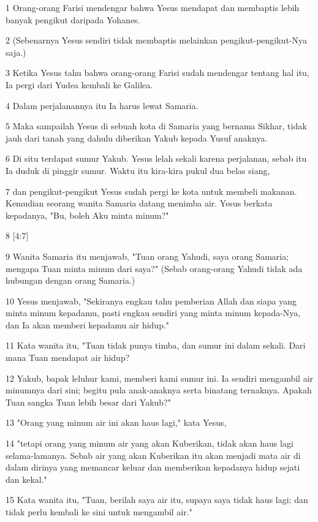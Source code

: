 \par 1 Orang-orang Farisi mendengar bahwa Yesus mendapat dan membaptis lebih banyak pengikut daripada Yohanes.
\par 2 (Sebenarnya Yesus sendiri tidak membaptis melainkan pengikut-pengikut-Nya saja.)
\par 3 Ketika Yesus tahu bahwa orang-orang Farisi sudah mendengar tentang hal itu, Ia pergi dari Yudea kembali ke Galilea.
\par 4 Dalam perjalanannya itu Ia harus lewat Samaria.
\par 5 Maka sampailah Yesus di sebuah kota di Samaria yang bernama Sikhar, tidak jauh dari tanah yang dahulu diberikan Yakub kepada Yusuf anaknya.
\par 6 Di situ terdapat sumur Yakub. Yesus lelah sekali karena perjalanan, sebab itu Ia duduk di pinggir sumur. Waktu itu kira-kira pukul dua belas siang,
\par 7 dan pengikut-pengikut Yesus sudah pergi ke kota untuk membeli makanan. Kemudian seorang wanita Samaria datang menimba air. Yesus berkata kepadanya, "Bu, boleh Aku minta minum?"
\par 8 [4:7]
\par 9 Wanita Samaria itu menjawab, "Tuan orang Yahudi, saya orang Samaria; mengapa Tuan minta minum dari saya?" (Sebab orang-orang Yahudi tidak ada hubungan dengan orang Samaria.)
\par 10 Yesus menjawab, "Sekiranya engkau tahu pemberian Allah dan siapa yang minta minum kepadamu, pasti engkau sendiri yang minta minum kepada-Nya, dan Ia akan memberi kepadamu air hidup."
\par 11 Kata wanita itu, "Tuan tidak punya timba, dan sumur ini dalam sekali. Dari mana Tuan mendapat air hidup?
\par 12 Yakub, bapak leluhur kami, memberi kami sumur ini. Ia sendiri mengambil air minumnya dari sini; begitu pula anak-anaknya serta binatang ternaknya. Apakah Tuan sangka Tuan lebih besar dari Yakub?"
\par 13 "Orang yang minum air ini akan haus lagi," kata Yesus,
\par 14 "tetapi orang yang minum air yang akan Kuberikan, tidak akan haus lagi selama-lamanya. Sebab air yang akan Kuberikan itu akan menjadi mata air di dalam dirinya yang memancar keluar dan memberikan kepadanya hidup sejati dan kekal."
\par 15 Kata wanita itu, "Tuan, berilah saya air itu, supaya saya tidak haus lagi; dan tidak perlu kembali ke sini untuk mengambil air."
